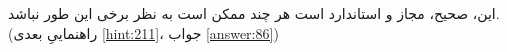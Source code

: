 \section{}
\paragraph{}\label{hint:89}
این،  صحیح، مجاز و استاندارد است هر چند ممکن است به نظر برخی این طور نباشد. (راهنماییِ بعدی \ref{hint:211}، جواب \ref{answer:86})